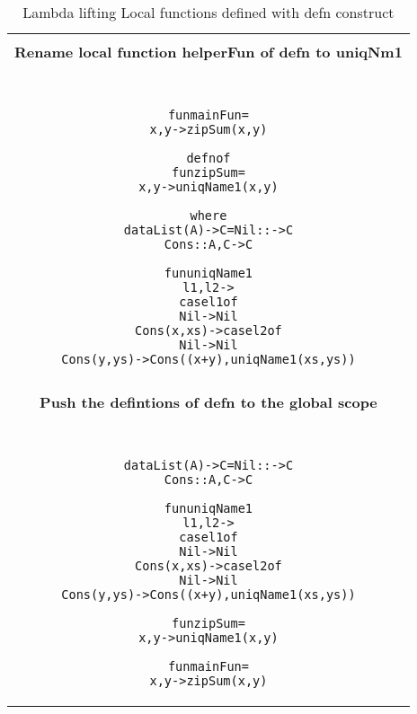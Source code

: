 \documentclass[11pt]{article}
\begin{document}
\begin{table}[h!]
\begin{center}
\begin{tabular}{|c|}\hline\\ 
{\bf Rename local function helperFun of {\sf defn} to uniqNm1}\\~~\\  
\hline
\begin{minipage}{5.5in}
\begin{alltt}


  fun mainFun = 
      x,y -> zipSum(x,y)
  
  defn of
    fun zipSum =
      x,y -> uniqName1(x,y)

  where 
        data List(A) -> C = Nil  ::     -> C
                            Cons :: A,C -> C 

        fun uniqName1 
          l1,l2 ->
            case l1 of 
              Nil -> Nil
              Cons(x,xs) -> case l2 of
                              Nil -> Nil
                              Cons(y,ys) -> Cons((x+y),uniqName1(xs,ys))


\end{alltt} 
\end {minipage} \\ 
\hline \\
{\bf Push the defintions of {\sf defn} to the global scope}\\~~\\  
\hline
\begin{minipage}{5in}
\begin{alltt}


  data List(A) -> C = Nil  ::     -> C
                      Cons :: A,C -> C 

  fun uniqName1 
    l1,l2 ->
      case l1 of 
        Nil -> Nil
        Cons(x,xs) -> case l2 of
                        Nil -> Nil
                        Cons(y,ys) -> Cons((x+y),uniqName1(xs,ys))

  fun zipSum =
      x,y -> uniqName1(x,y)

  fun mainFun = 
      x,y -> zipSum(x,y)




\end{alltt} 
\end {minipage} 
\tabularnewline
\hline
\end{tabular}
\caption{Lambda lifting Local functions defined with {\sf defn} construct}
\label{lam:LamLiftDefn}
\end{center}
\end{table}
\end{document}
